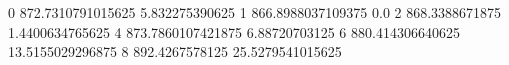 0 872.7310791015625 5.832275390625
1 866.8988037109375 0.0
2 868.3388671875 1.4400634765625
4 873.7860107421875 6.88720703125
6 880.414306640625 13.5155029296875
8 892.4267578125 25.5279541015625
